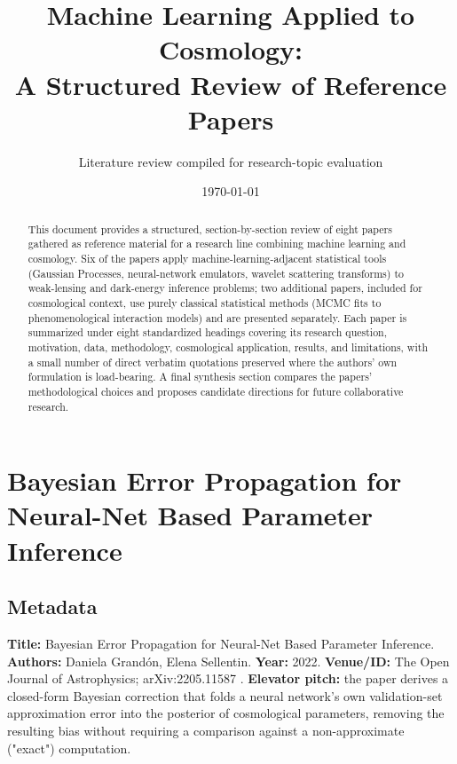 \documentclass[11pt]{article}
\title{Machine Learning Applied to Cosmology: \\ A Structured Review of Reference Papers}
\author{Literature review compiled for research-topic evaluation}
\date{\today}
\begin{document}
\maketitle

\begin{abstract}
\noindent This document provides a structured, section-by-section review of eight papers gathered as reference material for a research line combining machine learning and cosmology. Six of the papers apply machine-learning-adjacent statistical tools (Gaussian Processes, neural-network emulators, wavelet scattering transforms) to weak-lensing and dark-energy inference problems; two additional papers, included for cosmological context, use purely classical statistical methods (MCMC fits to phenomenological interaction models) and are presented separately. Each paper is summarized under eight standardized headings covering its research question, motivation, data, methodology, cosmological application, results, and limitations, with a small number of direct verbatim quotations preserved where the authors' own formulation is load-bearing. A final synthesis section compares the papers' methodological choices and proposes candidate directions for future collaborative research.
\end{abstract}

\tableofcontents
\newpage

\section{Bayesian Error Propagation for Neural-Net Based Parameter Inference}
\label{sec:paper1}

\subsection{Metadata}
\textbf{Title:} Bayesian Error Propagation for Neural-Net Based Parameter Inference. \textbf{Authors:} Daniela Grandón, Elena Sellentin. \textbf{Year:} 2022. \textbf{Venue/ID:} The Open Journal of Astrophysics; arXiv:2205.11587 \citep{grandon2022bayesian}. \textbf{Elevator pitch:} the paper derives a closed-form Bayesian correction that folds a neural network's own validation-set approximation error into the posterior of cosmological parameters, removing the resulting bias without requiring a comparison against a non-approximate ("exact") computation.
\end{document}

